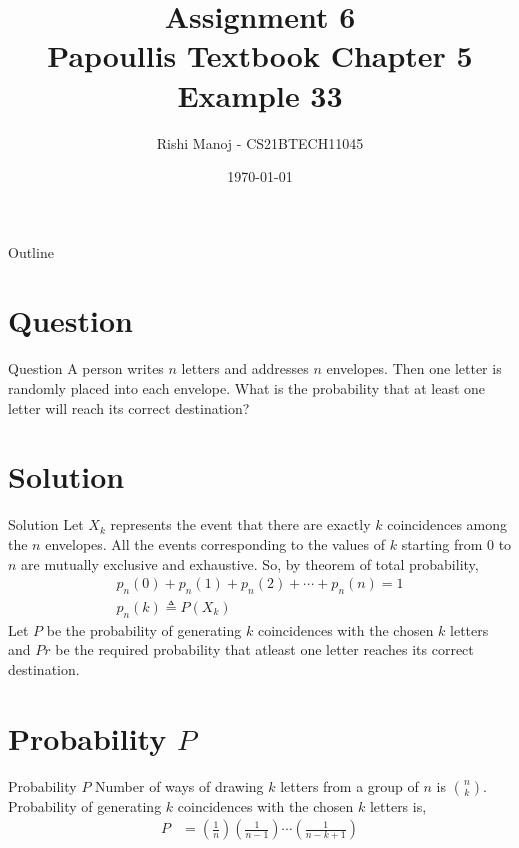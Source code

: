 \documentclass{beamer}
\title{Assignment 6 \\ Papoullis Textbook Chapter 5 Example 33}
\author{Rishi Manoj - CS21BTECH11045}
\date{\today}
\providecommand{\brak}[1]{\ensuremath{\left(#1\right)}}
\begin{document}
\begin{frame}
    \titlepage 
\end{frame}

\logo{}


\begin{frame}{Outline}
    \tableofcontents
\end{frame}


\section{Question}
\begin{frame}{Question}
A person writes $n$ letters and addresses $n$ envelopes. Then one letter is randomly placed into each envelope. What is the probability that at least one letter will reach its correct destination?
\end{frame}


\section{Solution}
\begin{frame}{Solution}
Let $X_k$ represents the event that there are exactly $k$ coincidences among the $n$ envelopes. All the events corresponding to the values of $k$ starting from 0 to $n$ are mutually exclusive and exhaustive. So, by theorem of total probability,
	\begin{align}
	       & p_n(0)+p_n(1)+p_n(2)+\cdots+p_n(n) = 1 &\\
	       & p_n(k) \triangleq P(X_k) &
	\end{align}
Let $P$ be the probability of generating $k$ coincidences with the chosen $k$ letters and $Pr$ be the required probability that atleast one letter reaches its correct destination.
\end{frame}


\section{Probability $P$}
\begin{frame}{Probability $P$}
Number of ways of drawing $k$ letters from a group of $n$ is ${n \choose k}$.
	Probability of generating $k$ coincidences with the chosen $k$ letters is,
	\begin{align}
	        P &= \brak{\frac{1}{n}}\brak{\frac{1}{n-1}}\cdots\brak{\frac{1}{n-k+1}} 
	\end{align}
\end{frame}
\end{document}

